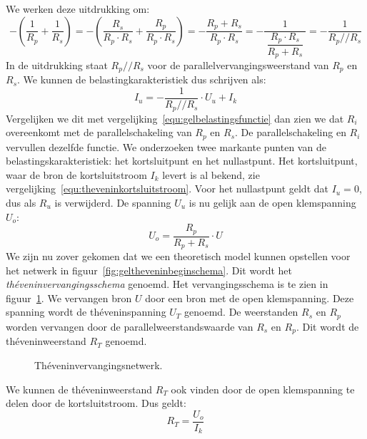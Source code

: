 %
We werken deze uitdrukking om:
%
\begin{equation}
- \left(\dfrac{1}{R_p}+\dfrac{1}{R_s}\right) = - \left(\dfrac{R_s}{R_p\cdot R_s}+\dfrac{R_p}{R_p\cdot R_s}\right) =
-\dfrac{R_p+R_s}{R_p\cdot R_s} = - \dfrac{1}{\ \dfrac{R_p\cdot R_s}{R_p+R_s}\ } = -\dfrac{1}{R_p // R_s}
\end{equation}
%
In de uitdrukking staat $R_p // R_s$ voor de parallelvervangingsweerstand van $R_p$ en $R_s$. We kunnen de
belastingkarakteristiek dus schrijven als:
%
\begin{equation}
I_u = -\dfrac{1}{R_p//R_s}\cdot U_u + I_k
\end{equation}
%
Vergelijken we dit met vergelijking~\eqref{equ:gelbelastingsfunctie} dan zien we dat $R_i$ overeenkomt
met de parallelschakeling van $R_p$ en $R_s$. De parallelschakeling en $R_i$ vervullen dezelfde functie.
We onderzoeken twee markante punten van de belastingskarakteristiek: het kortsluitpunt en het nullastpunt.
Het kortsluitpunt, waar de bron de kortsluitstroom $I_k$ levert is al bekend, zie
vergelijking~\eqref{equ:theveninkortsluitstroom}. Voor het nullastpunt geldt dat $I_u = 0$, dus als $R_u$
is verwijderd. De spanning $U_u$ is nu gelijk aan de open klemspanning $U_o$:
%
\begin{equation}
U_o = \dfrac{R_p}{R_p+R_s}\cdot U
\end{equation}
%
We zijn nu zover gekomen dat we een theoretisch model kunnen opstellen voor het netwerk in
figuur~\ref{fig:geltheveninbeginschema}. Dit wordt het \textsl{th\'eveninvervangingsschema} genoemd. Het
vervangingsschema is
te zien in figuur~\ref{fig:geltheveninvervangingsschema}. We vervangen bron $U$ door een bron met de open
klemspanning. Deze spanning wordt de th\'eveninspanning $U_T$ genoemd. De weerstanden $R_s$ en $R_p$ worden
vervangen door de parallelweerstandswaarde van $R_s$ en $R_p$. Dit wordt de th\'eveninweerstand $R_T$
genoemd.

\begin{figure}[!ht]
\centering
{}
\captionsetup{width=.9\linewidth}
\caption{Th\'eveninvervangingsnetwerk.}
\label{fig:geltheveninvervangingsschema}
\end{figure}

We kunnen de th\'eveninweerstand $R_T$ ook vinden door de open klemspanning te delen door de kortsluitstroom.
Dus geldt:
%
\begin{equation}
R_T = \dfrac{U_o}{I_k}
\end{equation}

